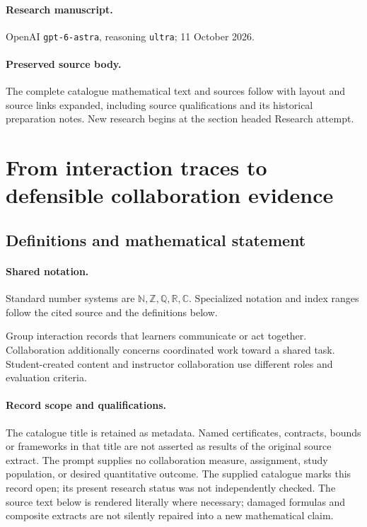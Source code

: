 \documentclass[11pt]{article}
\begin{document}
\paragraph{Research manuscript.} OpenAI \texttt{gpt-6-astra}, reasoning \texttt{ultra}; 11 October 2026.
\paragraph{Preserved source body.} The complete catalogue mathematical text and sources follow with layout and source links expanded, including source qualifications and its historical preparation notes. New research begins at the section headed Research attempt.

\section{From interaction traces to defensible collaboration evidence}\label{statement}

\subsection{Definitions and mathematical statement}

\paragraph{Shared notation.}Standard number systems are $\mathbb N,\mathbb Z,\mathbb Q,\mathbb R,\mathbb C$. Specialized notation and index ranges follow the cited source and the definitions below.


Group interaction records that learners communicate or act together. Collaboration additionally concerns coordinated work toward a shared task. Student-created content and instructor collaboration use different roles and evaluation criteria.
\paragraph{Record scope and qualifications.}
The catalogue title is retained as metadata. Named certificates, contracts, bounds or frameworks in that title are not asserted as results of the original source extract.
The prompt supplies no collaboration measure, assignment, study population, or desired quantitative outcome. The supplied catalogue marks this record open; its present research status was not independently checked.
The source text below is rendered literally where necessary; damaged formulas and composite extracts are not silently repaired into a new mathematical claim.
\end{document}
